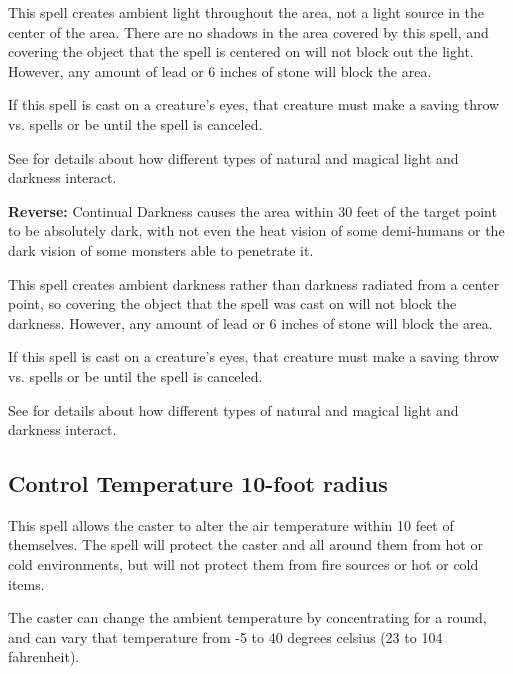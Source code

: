 \begin{multicols*}{2}
This spell creates ambient light throughout the area, not a light source in the center of the area. There are no shadows in the area covered by this spell, and covering the object that the spell is centered on will not block out the light. However, any amount of lead or 6 inches of stone will block the area.

If this spell is cast on a creature’s eyes, that creature must make a saving throw vs. spells or be  until the spell is canceled.

See  for details about how different types of natural and magical light and darkness interact.

\textbf{Reverse:} \hypertarget{spell:Continual Darkness}{Continual Darkness} causes the area within 30 feet of the target point to be absolutely dark, with not even the heat vision of some demi-humans or the dark vision of some monsters able to penetrate it.

This spell creates ambient darkness rather than darkness radiated from a center point, so covering the object that the spell was cast on will not block the darkness. However, any amount of lead or 6 inches of stone will block the area.

If this spell is cast on a creature’s eyes, that creature must make a saving throw vs. spells or be  until the spell is canceled.

See  for details about how different types of natural and magical light and darkness interact.

\subsection{Control Temperature 10-foot radius}\label{spell:Control Temperature 10-foot radius}

This spell allows the caster to alter the air temperature within 10 feet of themselves. The spell will protect the caster and all around them from hot or cold environments, but will not protect them from fire sources or hot or cold items.

The caster can change the ambient temperature by concentrating for a round, and can vary that temperature from -5 to 40 degrees celsius (23 to 104 fahrenheit).


\end{multicols*}

